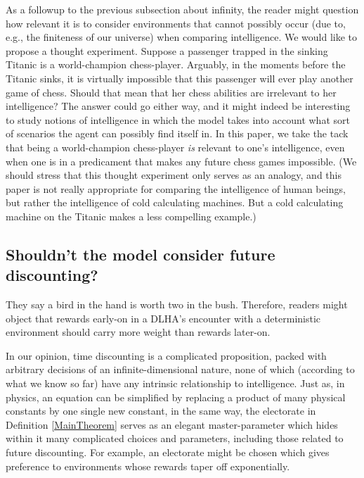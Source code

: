 \documentclass[twoside,11pt]{article}
\begin{document}
As a followup to the previous subsection about infinity, the reader might
question how relevant it is to consider environments that cannot possibly occur
(due to, e.g., the finiteness of our universe) when comparing intelligence.
We would like to propose a thought experiment. Suppose a passenger
trapped in the sinking Titanic is a world-champion chess-player. Arguably,
in the moments before the Titanic sinks, it is virtually impossible that this
passenger will ever play another game of chess. Should that mean
that her chess abilities are irrelevant to her intelligence? The answer could
go either way, and it might indeed be interesting to study notions of intelligence
in which the model takes into account what sort of scenarios the agent can
possibly find itself in. In this paper, we take the tack that being a world-champion
chess-player \emph{is} relevant to one's intelligence, even when one is in a
predicament that makes any future chess games impossible. (We should stress that
this thought experiment only serves as an analogy, and this paper is not really
appropriate for comparing the intelligence of human beings, but rather the
intelligence of cold calculating machines. But a cold calculating machine on the
Titanic makes a less compelling example.)

\subsection{Shouldn't the model consider future discounting?}

They say a bird in the hand is worth two in the bush. Therefore, readers
might object that rewards early-on in a DLHA's encounter with a deterministic
environment should carry more weight than rewards later-on.

In our opinion, time discounting is a complicated proposition, packed with
arbitrary decisions of an infinite-dimensional nature, none of which (according to what
we know so far) have any intrinsic relationship to intelligence.
Just as, in physics, an equation can be simplified by replacing a product of
many physical constants by one single new constant, in the same way,
the electorate in Definition \ref{MainTheorem} serves as an elegant master-parameter
which hides within it many complicated choices and parameters, including those
related to future discounting. For example, an electorate might be chosen which
gives preference to environments whose rewards taper off exponentially.
\end{document}
